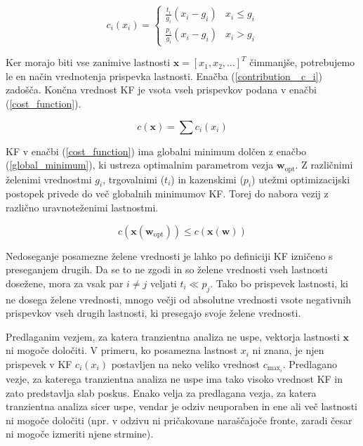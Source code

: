 \documentclass[journal,a4paper,twoside]{template/IEEEtran}
\begin{document}
\begin{equation}
	\label{contribution _c_i}
	c_i(x_i) =
	\left\{
		\begin{array}{ll}
			\frac{t_i}{g_i} (x_i - g_i) & x_i \le g_i \\
			\frac{p_i}{g_i} (x_i - g_i) & x_i > g_i
		\end{array}
	\right.
\end{equation}

Ker morajo biti vse zanimive lastnosti $\mathbf{x} = [x_1, x_2, \ldots]^T$ čimmanjše, potrebujemo le en način vrednotenja prispevka lastnosti. Enačba (\ref{contribution _c_i}) zadošča. Končna vrednost KF je vsota vseh prispevkov podana v enačbi (\ref{cost_function}).

\begin{equation}
	\label{cost_function}
	c(\mathbf{x}) = \sum c_i(x_i)
\end{equation}

KF v enačbi (\ref{cost_function}) ima globalni minimum dolčen z enačbo (\ref{global_minimum}), ki ustreza optimalnim parametrom vezja $\mathbf{w}_\mathrm{opt}$. Z različnimi želenimi vrednostmi $g_i$, trgovalnimi ($t_i$) in kazenskimi ($p_i$) utežmi optimizacijski postopek privede do več globalnih minimumov KF. Torej do nabora vezij z različno uravnoteženimi lastnostmi.

\begin{equation}
	\label{global_minimum}
	c(\mathbf{x}(\mathbf{w}_\mathrm{opt})) \le c(\mathbf{x}(\mathbf{w}))
\end{equation}

Nedoseganje posamezne želene vrednosti je lahko po definiciji KF izničeno s preseganjem drugih. Da se to ne zgodi in so želene vrednosti vseh lastnosti dosežene, mora za vsak par $i \ne j$ veljati $t_i \ll p_j$. Tako bo prispevek lastnosti, ki ne dosega želene vrednosti, mnogo večji od absolutne vrednosti vsote negativnih prispevkov vseh drugih lastnosti, ki presegajo svoje želene vrednosti.

Predlaganim vezjem, za katera tranzientna analiza ne uspe, vektorja lastnosti $\mathbf{x}$ ni mogoče določiti. V primeru, ko posamezna lastnost $x_i$ ni znana, je njen prispevek v KF $c_i(x_i)$ postavljen na neko veliko vrednost $c_{\mathrm{max}_i}$. Predlagano vezje, za katerega tranzientna analiza ne uspe ima tako visoko vrednost KF in zato predstavlja slab poskus. Enako velja za predlagana vezja, za katera tranzientna analiza sicer uspe, vendar je odziv neuporaben in ene ali več lastnosti ni mogoče določiti (npr. v odzivu ni pričakovane naraščajoče fronte, zaradi česar ni mogoče izmeriti njene strmine). 
\end{document}
